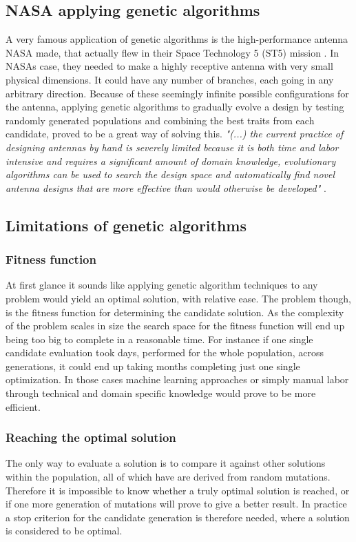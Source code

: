 \documentclass[a4paper,english]{report}
\begin{document}
			\subsection{NASA applying genetic algorithms}A very famous application of genetic algorithms is the high-performance antenna NASA made, that actually flew in their Space Technology 5 (ST5) mission \cite{nasa}. In NASAs case, they needed to make a highly receptive antenna with very small physical dimensions. It could have any number of branches, each going in any arbitrary direction. Because of these seemingly infinite possible configurations for the antenna, applying genetic algorithms to gradually evolve a design by testing randomly generated populations and combining the best traits from each candidate, proved to be a great way of solving this. \emph{"(...) the current practice of designing antennas by hand is severely limited because it is both time and labor intensive and requires a significant amount of domain knowledge, evolutionary algorithms can be used to search the design space and automatically find novel antenna designs that are more effective than would otherwise be developed"} \cite{nasa}.
			\clearpage
			\subsection{Limitations of genetic algorithms}
			\subsubsection{Fitness function}
			At first glance it sounds like applying genetic algorithm techniques to any problem would yield an optimal solution, with relative ease. The problem though, is the fitness function for determining the candidate solution. As the complexity of the problem scales in size the search space for the fitness function will end up being too big to complete in a reasonable time. For instance if one single candidate evaluation took days, performed for the whole population, across generations, it could end up taking months completing just one single optimization. In those cases machine learning approaches or simply manual labor through technical and domain specific knowledge would prove to be more efficient.
			\subsubsection{Reaching the optimal solution}
			The only way to evaluate a solution is to compare it against other solutions within the population, all of which have are derived from random mutations. Therefore it is impossible to know whether a truly optimal solution is reached, or if one more generation of mutations will prove to give a better result. In practice a stop criterion for the candidate generation is therefore needed, where a solution is considered to be optimal.
\end{document}
